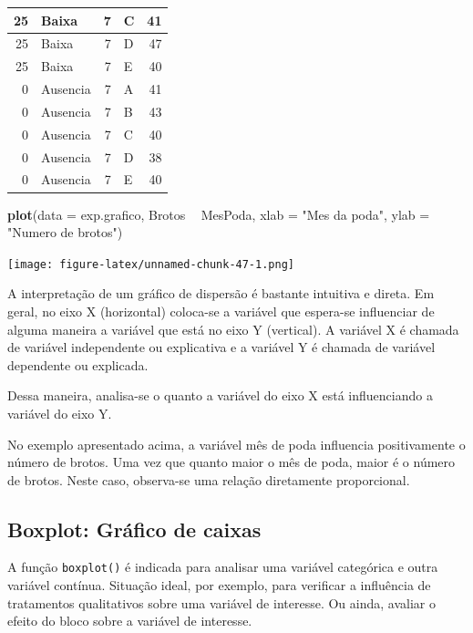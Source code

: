 \documentclass[
]{article}
\newenvironment{Shaded}{\begin{snugshade}}{\end{snugshade}}
\newcommand{\DataTypeTok}[1]{\textcolor[rgb]{0.13,0.29,0.53}{#1}}
\newcommand{\KeywordTok}[1]{\textcolor[rgb]{0.13,0.29,0.53}{\textbf{#1}}}
\newcommand{\NormalTok}[1]{#1}
\newcommand{\OperatorTok}[1]{\textcolor[rgb]{0.81,0.36,0.00}{\textbf{#1}}}
\newcommand{\StringTok}[1]{\textcolor[rgb]{0.31,0.60,0.02}{#1}}
\begin{document}
\begin{table}
\begin{tabular}[t]{r|l|r|l|r}
\hline
25 & Baixa & 7 & C & 41\\
\hline
25 & Baixa & 7 & D & 47\\
\hline
25 & Baixa & 7 & E & 40\\
\hline
0 & Ausencia & 7 & A & 41\\
\hline
0 & Ausencia & 7 & B & 43\\
\hline
0 & Ausencia & 7 & C & 40\\
\hline
0 & Ausencia & 7 & D & 38\\
\hline
0 & Ausencia & 7 & E & 40\\
\hline
\end{tabular}
\end{table}

\begin{Shaded}
\begin{Highlighting}[]
\KeywordTok{plot}\NormalTok{(}\DataTypeTok{data =}\NormalTok{ exp.grafico, Brotos }\OperatorTok{~}\StringTok{ }\NormalTok{MesPoda, }
     \DataTypeTok{xlab =} \StringTok{"Mes da poda"}\NormalTok{, }
     \DataTypeTok{ylab =} \StringTok{"Numero de brotos"}\NormalTok{)}
\end{Highlighting}
\end{Shaded}

\texttt{[image: figure-latex/unnamed-chunk-47-1.png]}

A interpretação de um gráfico de dispersão é bastante intuitiva e direta. Em geral, no eixo X (horizontal) coloca-se a variável que espera-se influenciar de alguma maneira a variável que está no eixo Y (vertical). A variável X é chamada de variável independente ou explicativa e a variável Y é chamada de variável dependente ou explicada.

Dessa maneira, analisa-se o quanto a variável do eixo X está influenciando a variável do eixo Y.

No exemplo apresentado acima, a variável mês de poda influencia positivamente o número de brotos. Uma vez que quanto maior o mês de poda, maior é o número de brotos. Neste caso, observa-se uma relação diretamente proporcional.

\hypertarget{boxplot-gruxe1fico-de-caixas}{%
\subsection{Boxplot: Gráfico de caixas}\label{boxplot-gruxe1fico-de-caixas}}

A função \texttt{boxplot()} é indicada para analisar uma variável categórica e outra variável contínua. Situação ideal, por exemplo, para verificar a influência de tratamentos qualitativos sobre uma variável de interesse. Ou ainda, avaliar o efeito do bloco sobre a variável de interesse.
\end{document}
